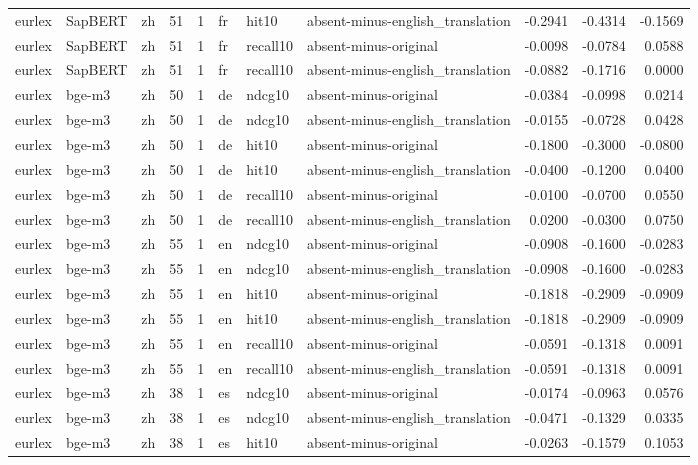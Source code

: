 \begin{tabular}{lllrrlllrrr}
eurlex & SapBERT & zh & 51 & 1 & fr & hit10 & absent-minus-english\_translation & -0.2941 & -0.4314 & -0.1569 \\
eurlex & SapBERT & zh & 51 & 1 & fr & recall10 & absent-minus-original & -0.0098 & -0.0784 & 0.0588 \\
eurlex & SapBERT & zh & 51 & 1 & fr & recall10 & absent-minus-english\_translation & -0.0882 & -0.1716 & 0.0000 \\
eurlex & bge-m3 & zh & 50 & 1 & de & ndcg10 & absent-minus-original & -0.0384 & -0.0998 & 0.0214 \\
eurlex & bge-m3 & zh & 50 & 1 & de & ndcg10 & absent-minus-english\_translation & -0.0155 & -0.0728 & 0.0428 \\
eurlex & bge-m3 & zh & 50 & 1 & de & hit10 & absent-minus-original & -0.1800 & -0.3000 & -0.0800 \\
eurlex & bge-m3 & zh & 50 & 1 & de & hit10 & absent-minus-english\_translation & -0.0400 & -0.1200 & 0.0400 \\
eurlex & bge-m3 & zh & 50 & 1 & de & recall10 & absent-minus-original & -0.0100 & -0.0700 & 0.0550 \\
eurlex & bge-m3 & zh & 50 & 1 & de & recall10 & absent-minus-english\_translation & 0.0200 & -0.0300 & 0.0750 \\
eurlex & bge-m3 & zh & 55 & 1 & en & ndcg10 & absent-minus-original & -0.0908 & -0.1600 & -0.0283 \\
eurlex & bge-m3 & zh & 55 & 1 & en & ndcg10 & absent-minus-english\_translation & -0.0908 & -0.1600 & -0.0283 \\
eurlex & bge-m3 & zh & 55 & 1 & en & hit10 & absent-minus-original & -0.1818 & -0.2909 & -0.0909 \\
eurlex & bge-m3 & zh & 55 & 1 & en & hit10 & absent-minus-english\_translation & -0.1818 & -0.2909 & -0.0909 \\
eurlex & bge-m3 & zh & 55 & 1 & en & recall10 & absent-minus-original & -0.0591 & -0.1318 & 0.0091 \\
eurlex & bge-m3 & zh & 55 & 1 & en & recall10 & absent-minus-english\_translation & -0.0591 & -0.1318 & 0.0091 \\
eurlex & bge-m3 & zh & 38 & 1 & es & ndcg10 & absent-minus-original & -0.0174 & -0.0963 & 0.0576 \\
eurlex & bge-m3 & zh & 38 & 1 & es & ndcg10 & absent-minus-english\_translation & -0.0471 & -0.1329 & 0.0335 \\
eurlex & bge-m3 & zh & 38 & 1 & es & hit10 & absent-minus-original & -0.0263 & -0.1579 & 0.1053 \\

\end{tabular}
